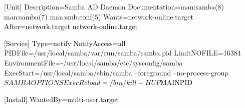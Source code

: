 [Unit]
Description=Samba AD Daemon
Documentation=man:samba(8) man:samba(7) man:smb.conf(5)
Wants=network-online.target
After=network.target network-online.target

[Service]
Type=notify
NotifyAccess=all
PIDFile=/usr/local/samba/var/run/samba/samba.pid
LimitNOFILE=16384
EnvironmentFile=-/usr/local/samba/etc/sysconfig/samba
ExecStart=/usr/local/samba/sbin/samba --foreground --no-process-group $SAMBAOPTIONS
ExecReload=/bin/kill -HUP $MAINPID


[Install]
WantedBy=multi-user.target